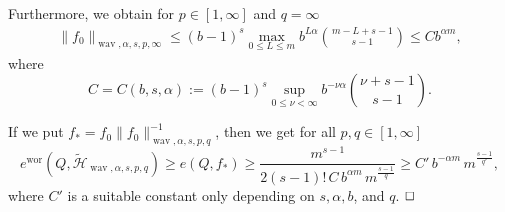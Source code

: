 \documentclass[12pt]{article}
\DeclareMathOperator{\wav}{wav}
\DeclareMathOperator{\wor}{wor}
\newenvironment{proof}{\begin{trivlist}
    \item[\hskip\labelsep{\it Proof.}]}{$\hfill\Box$\end{trivlist}}
\newcommand{\bsk}{\boldsymbol{k}}
\newcommand{\bsi}{\boldsymbol{i}}
\newcommand{\bsj}{\boldsymbol{j}}
\newcommand{\HH}{\mathcal{H}}
\begin{document}
\begin{proof}[Proof of Theorem \ref{LowerBound}]
Furthermore, we obtain for $p\in [1,\infty]$ and $q = \infty$
\begin{equation*}
\begin{split}
\|f_0\|_{\wav,\alpha,s,p,\infty} 
\le (b-1)^{s} \max_{0\le L \le m} b^{L\alpha} 
{m-L+s-1 \choose s-1} \le C  b^{\alpha m},
\end{split}
\end{equation*}
where
$$C=C(b,s,\alpha) := (b-1)^s \sup_{0\le \nu < \infty} b^{-\nu \alpha} {\nu + s-1 \choose s-1}.$$

If we put $f_* = f_0 \|f_0\|_{\wav,\alpha,s,p,q}^{-1}$, then we get for all $p,q\in [1,\infty]$
\begin{equation*}
e^{\wor}(Q, \widetilde{\HH}_{\wav, \alpha, s,p,q}) \ge  e(Q, f_*) \ge \frac{m^{s-1}}{2(s-1)!\, C\, b^{\alpha m} \, m^{\frac{s-1}{q}}}
\ge C'\, b^{- \alpha m}\, m^{\frac{s-1}{q'}},
\end{equation*}
where $C'$ is a suitable constant only depending on $s,\alpha, b$, and $q$.
\end{proof}
\end{document}
